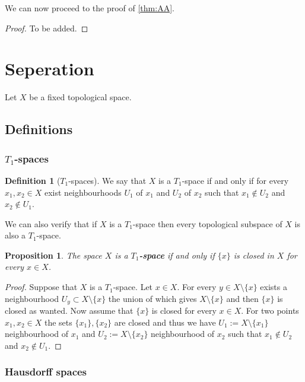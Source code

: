 \documentclass[11pt,a4paper]{article}
\theoremstyle{definition}
\newtheorem{definition}{Definition}[section]
\theoremstyle{plain}
\newtheorem{proposition}[theorem]{Proposition}
\begin{document}
  We can now proceed to the proof of \autoref{thm:AA}.

  \begin{proof}
    To be added.
  \end{proof}

  \newpage

  \section{Seperation}

  Let $X$ be a fixed topological space.
  
  \subsection{Definitions}

  \subsubsection{\texorpdfstring{$T_1$}{}-spaces}

  \begin{definition}[$T_1$-spaces]
    We say that $X$ is a $T_1$-space if and only if for every
    $x_1, x_2 \in X$ exist neighbourhoods $U_1$ of $x_1$ and $U_2$ of
    $x_2$ such that $x_1 \notin U_2$ and $x_2 \notin U_1$.
  \end{definition}
  
  We can also verify that if $X$ is a $T_1$-space then every topological
  subspace of $X$ is also a $T_1$-space.
  
  \begin{proposition}
    The space $X$ is a $T_1$\textbf{-space} if and only if $\{x\}$ is 
    closed in $X$ for every $x \in X$.
  \end{proposition}
  \begin{proof}
    Suppose that $X$ is a $T_1$-space. Let $x \in X$. For every 
    $y \in X \setminus \{x\}$ exists a neighbourhood 
    $U_y \subset X \setminus \{x\}$ the union of which gives 
    $X \setminus \{x\}$ and then $\{x\}$ is closed as wanted. Now
    assume that $\{x\}$ is closed for every $x \in X$. For two points
    $x_1,x_2 \in X$ the sets $\{x_1\},\{x_2\}$ are closed and thus
    we have $U_1 := X \setminus \{x_1\}$ neighbourhood of $x_1$ and
    $U_2 := X \setminus \{x_2\}$ neighbourhood of $x_2$ such that
    $x_1 \notin U_2$ and $x_2 \notin U_1$.
  \end{proof}
  
  \subsubsection{Hausdorff spaces}
  
\end{document}
